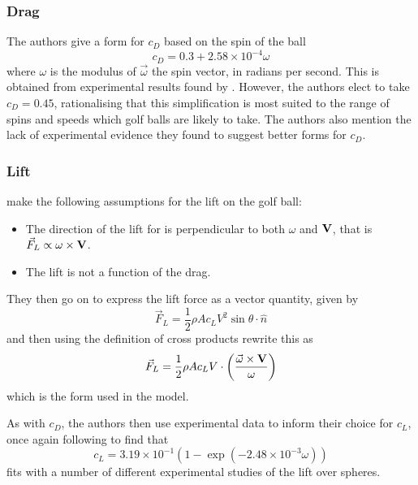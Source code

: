 \subsubsection{Drag}

The authors give a form for $c_D$ based on the spin of the ball
\begin{equation}
c_D = 0.3 + 2.58\times10^{-4}\omega
\end{equation}
where $\omega$ is the modulus of $\vec{\omega}$ the spin vector, in radians per second. This is obtained 
from experimental results found by
\citet{davies1949aerodynamics}. However, the authors elect to take $c_D = 0.45$, rationalising that
this simplification is most suited to the range of spins and speeds which golf balls are likely to
take. The authors also mention the lack of experimental evidence they found to suggest better forms
for $c_D$.

\subsubsection{Lift}

\citeauthor*{Robinson2013} make the following assumptions for the lift on the golf ball:
\begin{itemize}
\item The direction of the lift for is perpendicular to both $\omega$ and $\mathbf{V}$, that is $\vec{F}_{L} \propto \omega \times \mathbf{V}$.
\item The lift is not a function of the drag.
\end{itemize}

They then go on to express the lift force as a vector quantity, given by
\begin{equation}
\vec{F}_{L} = \frac{1}{2} \rho A c_{L} V^2 \sin \theta \cdot \hat{n}
\end{equation}
and then using the definition of cross products rewrite this as
\begin{equation}
\vec{F}_L = \frac{1}{2} \rho A c_L V \cdot \left(\frac{\vec{\omega} \times \mathbf{V}}{\omega}\right)
\end{equation}
which is the form used in the model.

As with $c_D$, the authors then use experimental data to inform their choice for $c_L$, once again
following \citet{davies1949aerodynamics} to find that
\begin{equation} \label{cl-rr}
c_L = 3.19\times10^{-1} \left(1 - \exp(-2.48\times10^{-3} \omega)\right)
\end{equation}
fits with a number of different experimental studies of the lift over spheres.

